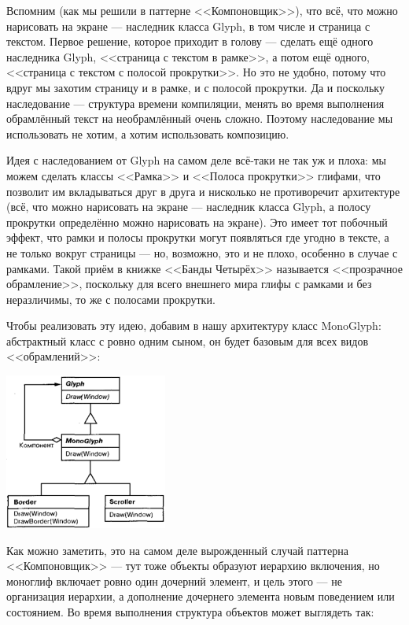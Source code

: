 \documentclass{../text-style}
\begin{document}
Вспомним (как мы решили в паттерне <<Компоновщик>>), что всё, что можно нарисовать на экране --- наследник класса Glyph, в том числе и страница с текстом. Первое решение, которое приходит в голову --- сделать ещё одного наследника Glyph, <<страница с текстом в рамке>>, а потом ещё одного, <<страница с текстом с полосой прокрутки>>. Но это не удобно, потому что вдруг мы захотим страницу и в рамке, и с полосой прокрутки. Да и поскольку наследование --- структура времени компиляции, менять во время выполнения обрамлённый текст на необрамлённый очень сложно. Поэтому наследование мы использовать не хотим, а хотим использовать композицию. 

Идея с наследованием от Glyph на самом деле всё-таки не так уж и плоха: мы можем сделать классы <<Рамка>> и <<Полоса прокрутки>> глифами, что позволит им вкладываться друг в друга и нисколько не противоречит архитектуре (всё, что можно нарисовать на экране --- наследник класса Glyph, а полосу прокрутки определённо можно нарисовать на экране). Это имеет тот побочный эффект, что рамки и полосы прокрутки могут появляться где угодно в тексте, а не только вокруг страницы --- но, возможно, это и не плохо, особенно в случае с рамками. Такой приём в книжке <<Банды Четырёх>> называется <<прозрачное обрамление>>, поскольку для всего внешнего мира глифы с рамками и без неразличимы, то же с полосами прокрутки.

Чтобы реализовать эту идею, добавим в нашу архитектуру класс MonoGlyph: абстрактный класс с ровно одним сыном, он будет базовым для всех видов <<обрамлений>>:

\begin{center}
    \includegraphics[width=0.4\textwidth]{monoglyph.png}
\end{center}

Как можно заметить, это на самом деле вырожденный случай паттерна <<Компоновщик>> --- тут тоже объекты образуют иерархию включения, но моноглиф включает ровно один дочерний элемент, и цель этого --- не организация иерархии, а дополнение дочернего элемента новым поведением или состоянием. Во время выполнения структура объектов может выглядеть так:
\end{document}
